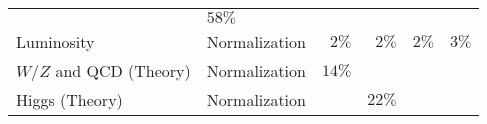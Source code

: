 \begin{table}[htpb]
\begin{tabular}{@{}llrrrr@{}}
                            & $58\%$                                                                                                     \\
  Luminosity                & Normalization  & $2\%$    & $2\%$  & $2\%$                             &
  $3\%$                                                                                                                                  \\
  $W$/$Z$ and QCD (Theory)  & Normalization  & $14\%$   &        &                                   &
  \\
  Higgs (Theory)            & Normalization  &          & $22\%$ &                                   &
  \\
  \bottomrule
 \end{tabular}
 \label{table:systematic_uncertainties}
\end{table}
